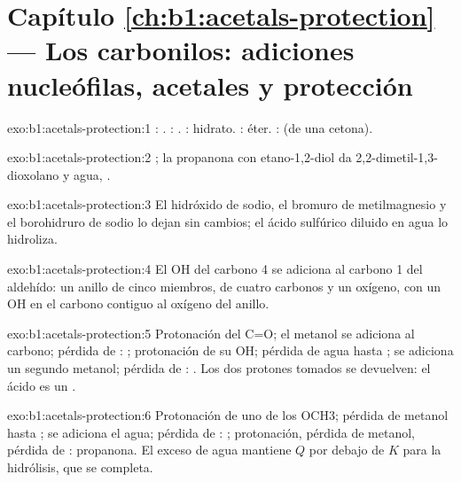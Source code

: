 \section*{Capítulo \ref{ch:b1:acetals-protection} --- Los carbonilos: adiciones nucleófilas, acetales y protección}

\begin{solution}{exo:b1:acetals-protection:1}
: . : .
: hidrato. : éter. :
 (de una cetona).
\end{solution}

\begin{solution}{exo:b1:acetals-protection:2}
; la propanona con
etano-1,2-diol da 2,2-dimetil-1,3-dioxolano y agua,
.
\end{solution}

\begin{solution}{exo:b1:acetals-protection:3}
El hidróxido de sodio, el bromuro de metilmagnesio y el borohidruro de
sodio lo dejan sin cambios; el ácido sulfúrico diluido en agua lo
hidroliza.
\end{solution}

\begin{solution}{exo:b1:acetals-protection:4}
El OH del carbono 4 se adiciona al carbono 1 del aldehído: un anillo de
cinco miembros, de cuatro carbonos y un oxígeno, con un OH en el carbono
contiguo al oxígeno del anillo.
\end{solution}

\begin{solution}{exo:b1:acetals-protection:5}
Protonación del C=O; el metanol se adiciona al carbono; pérdida de
: ; protonación de su OH; pérdida de agua hasta
; se adiciona un segundo metanol; pérdida de :
. Los dos protones tomados se devuelven: el ácido es un
.
\end{solution}

\begin{solution}{exo:b1:acetals-protection:6}
Protonación de uno de los OCH3; pérdida de metanol hasta
; se adiciona el agua; pérdida de : ;
protonación, pérdida de metanol, pérdida de : propanona. El exceso
de agua mantiene $Q$ por debajo de $K$ para la hidrólisis, que se completa.
\end{solution}

